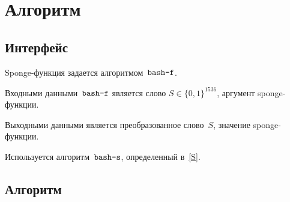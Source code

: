 \section{Алгоритм }\label{F}

\subsection{Интерфейс}\label{F.IFace}

Sponge-функция задается алгоритмом~$\texttt{bash-f}$.

Входными данными~$\texttt{bash-f}$ является слово $S\in\{0,1\}^{1536}$,
аргумент sponge-функции.

Выходными данными является преобразованное слово~$S$,
значение sponge-функции.

Используется алгоритм~$\texttt{bash-s}$, определенный в~\ref{S}.

\subsection{Алгоритм}\label{F.Steps}

